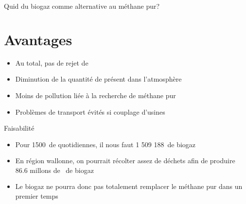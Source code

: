\documentclass{beamer}
\begin{document}
\begin{frame}{Quid du biogaz comme alternative au méthane pur?}
\part*{Avantages}
\begin{itemize}
\item Au total, pas de rejet de 
\item Diminution de la quantité de  présent dans l'atmosphère
\item Moins de pollution liée à la recherche de méthane pur
\item Problèmes de transport évités si couplage d'usines
\end{itemize}
\end{frame}

\begin{frame}{Faisabilité}
\begin{itemize}
\item Pour 1500\tonne \ de  quotidiennes, il nous faut 1 509 188\cubic\meter \ de biogaz
\item En région wallonne, on pourrait récolter assez de déchets afin de produire 86.6 millons de \cubic\meter \ de biogaz
\item Le biogaz ne pourra donc pas totalement remplacer le méthane pur dans un premier temps
\end{itemize}

\end{frame}
\end{document}

